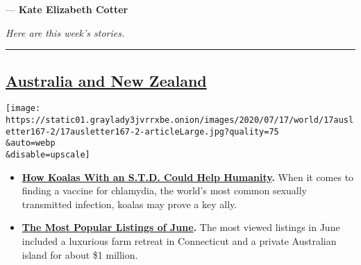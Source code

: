 --- \textbf{Kate Elizabeth Cotter}

\emph{Here are this week's stories.}

\begin{center}\rule{0.5\linewidth}{\linethickness}\end{center}

\hypertarget{australia-and-new-zealand}{%
\subsection{\texorpdfstring{\href{https://www.nytimes3xbfgragh.onion/section/world/australia}{Australia
and New
Zealand}}{Australia and New Zealand}}\label{australia-and-new-zealand}}

\texttt{[image: https://static01.graylady3jvrrxbe.onion/images/2020/07/17/world/17ausletter167-2/17ausletter167-2-articleLarge.jpg?quality=75\\\&auto=webp\\\&disable=upscale]}

\begin{itemize}
\tightlist
\item
  \textbf{\href{https://www.nytimes3xbfgragh.onion/2020/07/13/science/chlamydia-koalas-vaccines.html}{How
  Koalas With an S.T.D. Could Help Humanity}.} When it comes to finding
  a vaccine for chlamydia, the world's most common sexually transmitted
  infection, koalas may prove a key ally.
\end{itemize}

\begin{itemize}
\tightlist
\item
  \textbf{\href{https://www.nytimes3xbfgragh.onion/2020/07/16/realestate/the-most-popular-listings-of-june.html}{The
  Most Popular Listings of June}.} The most viewed listings in June
  included a luxurious farm retreat in Connecticut and a private
  Australian island for about \$1 million.
\end{itemize}

